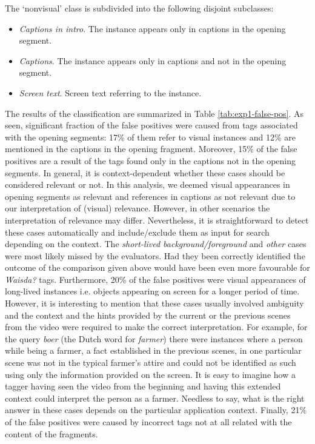 The `nonvisual' class is subdivided into the following disjoint subclasses:
\begin{itemize}
\item \textit{Captions in intro}. The instance appears only in captions in the opening segment.
\item \textit{Captions}. The instance appears only in captions and not in the opening segment.
\item \textit{Screen text}. Screen text referring to the instance.
\end{itemize}
The results of the classification are summarized in Table \ref{tab:exp1-false-pos}. As seen, significant fraction of the false positives were caused from tags associated with the opening segments: 17\% of them refer to visual instances and 12\% are mentioned in the captions in the opening fragment. Moreover, 15\% of the false positives are a result of the tags found only in the captions not in the opening segments. In general, it is context-dependent whether these cases should be considered relevant or not. In this analysis, we deemed visual appearances in opening segments as relevant and references in captions as not relevant due to our interpretation of (visual) relevance. However, in other scenarios the interpretation of relevance may differ. Nevertheless, it is straightforward to detect these cases automatically and include/exclude them as input for search depending on the context.
The \textit{short-lived background/foreground} and \textit{other} cases were most likely missed by the evaluators. Had they been correctly identified the outcome of the comparison given above would have been even more favourable for \textit{Waisda?} tags. 
Furthermore, 20\% of the false positives were visual appearances of long-lived instances i.e. objects appearing on screen for a longer period of time. However, it is interesting to mention that these cases usually involved ambiguity and the context and the hints provided by the current or the previous scenes from the video were required to make the correct interpretation. For example, for the query \textit{boer} (the Dutch word for \textit{farmer}) there were instances where a person while being a farmer, a fact established in the previous scenes, in one particular scene was not in the typical farmer's attire and could not be identified as such using only the information provided on the screen. It is easy to imagine how a tagger having seen the video from the beginning and having this extended context could interpret the person as a farmer. Needless to say, what is the right answer in these cases depends on the particular application context. Finally, 21\% of the false positives were caused by incorrect tags not at all related with the content of the fragments.

